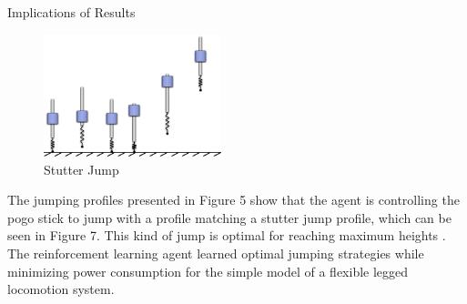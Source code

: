 \documentclass[final]{beamer}
\newlength{\onecolwid}
\begin{document}
\begin{frame}[t]
\begin{columns}[t]
\begin{column}{\onecolwid}
\begin{block}{Implications of Results}
%
\begin{figure}
    \captionsetup{justification=centering, labelformat=simple}
    \begin{center}
        \vspace{-0.25 in}
        \includegraphics[width=0.46\textwidth]{figures/stutter_jump.png}
        \caption{Stutter Jump \cite{Vaughan2013}}
        \label{Stutter Jump}
        \vspace{-0.5 in}
    \end{center}
\end{figure}
%
The jumping profiles presented in Figure 5 show that the agent is controlling the pogo stick to jump with a profile matching a stutter jump profile, which can be seen in Figure 7. This kind of jump is optimal for reaching maximum heights \cite{Vaughan2013}. The reinforcement learning agent learned optimal jumping strategies while minimizing power consumption for the simple model of a flexible legged locomotion system.
\end{block}







\end{column}
\end{columns}
\end{frame}
\end{document}
